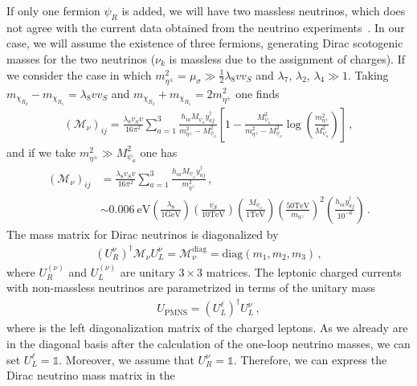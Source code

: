 \documentclass[12pt]{article}
\begin{document}
If only one
fermion $\psi_R$ is added, we will have two massless neutrinos, which
does not agree with the current data obtained from the neutrino
experiments~\cite{deSalas:2017kay}. In our case, we will assume the
existence of three fermions, generating Dirac scotogenic masses for
the two neutrinos ($\nu_{k}$ is massless due to the assignment of
charges). If we consider the case in which $m_{\eta^{\pm}}^2 = \mu_{\sigma} \gg \frac{1}{2} \lambda_8 v v_S$ and $\lambda_7$, $\lambda_2$, $\lambda_4 \gg 1$. Taking $m_{\chi_{R_{2}}}-m_{\chi_{R_{1}}} = \lambda_8 v v_{S}$ and $m_{\chi_{R_{2}}}+m_{\chi_{R_{1}}} = 2 m_{\eta^{\pm}}^{2}$ one finds
%
\begin{align*}
(\mathcal{M}_{\nu})_{ij} = \frac{\lambda_8 v_S v}{16 \pi^{2}} \sum_{a=1}^{3} \frac{h_{i a} M_{\psi_{a}}y^{\dagger}_{a j}} {m_{\eta^{\pm}}^{2}-M_{\psi_{a}}^{2}} \left[1 - \frac{M_{\psi_{a}}^{2}}{m_{\eta^{\pm}}^{2}-M_{\psi_{a}}^{2}} \log \left( \frac{m_{\eta^{\pm}}^{2}}{M_{\psi_{a}}^{2}} \right)\right]\,,
\end{align*}
%
and if we take $m_{\eta^{\pm}}^{2} \gg M_{\psi_{a}}^{2}$ one has 
%
\begin{align}
(\mathcal{M}_{\nu})_{ij} & = \frac{\lambda_8 v_S v}{16 \pi^{2}} \sum_{a=1}^{3} \frac{h_{i a} M_{\psi_{a}}y^{\dagger}_{a j}} {m_{\eta^{\pm}}^{2}}\,, \\
& \sim 0.006~\text{eV} \left( \frac{\lambda_8}{1 \text{GeV}}\right) \left( \frac{v_{S}}{10 \text{TeV}}\right) \left( \frac{M_{\psi_{a}}}{1 \text{TeV}}\right) \left( \frac{50 \text{TeV}}{m_{\eta^{\pm}}}\right)^{2} \left( \frac{h_{i a} y_{a j}^{\dagger}}{10^{-6}}\right)\,. \nonumber
\end{align}
%
The mass matrix for Dirac neutrinos is diagonalized by
\begin{align*}
(U^{\nu}_R)^{\dagger} \mathcal{M}_{\nu} U^{\nu}_L = \mathcal{M}_{\nu}^{\text{diag}} = \text{diag}(m_1, m_2, m_3)\,,
\end{align*}
where $U^{(\nu)}_R$ and $U^{(\nu)}_L$ are unitary $3 \times 3$
matrices. The leptonic charged currents with non-massless neutrinos
are parametrized in terms of the unitary mass
\begin{align*}
U_{\text{PMNS}} = \left( U^{\ell}_L \right)^{\dagger} U^{\nu}_L\,,
\end{align*}
where is the left diagonalization matrix of the charged leptons.
As we already are in the diagonal basis after the calculation of the
one-loop neutrino masses, we can set
$U_{L}^{\ell} = \mathds{1}$. Moreover, we assume that $U_{R}^{\nu} = \mathds{1}$.
Therefore, we can express the Dirac neutrino mass matrix in the
\end{document}

